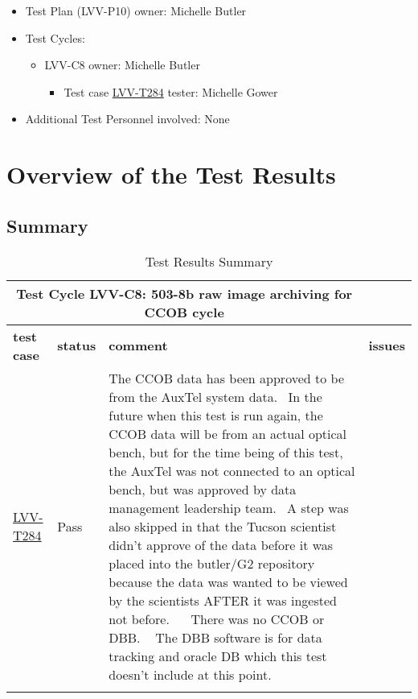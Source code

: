 \documentclass[DM,STR,toc]{lsstdoc}
\begin{document}
\begin{itemize}
\item Test Plan (LVV-P10) owner: Michelle Butler
\item Test Cycles:
\begin{itemize}
  \item LVV-C8 owner: 
    Michelle Butler
  \begin{itemize}
    \item Test case \href{https://jira.lsstcorp.org/secure/Tests.jspa#/testCase/LVV-T284}{LVV-T284} tester: Michelle Gower
  \end{itemize}
\end{itemize}
\item Additional Test Personnel involved: None
\end{itemize}

\newpage

\section{Overview of the Test Results}
\label{sect:overview}

\subsection{Summary}
\label{sect:summarytable}

\begin{longtable}{p{}p{}p{}p{}}
\toprule

  \multicolumn{3}{c}{ Test Cycle {\bf LVV-C8: 503-8b raw image archiving for CCOB cycle
 }} \\\hline

  {\bf \footnotesize test case} & {\bf \footnotesize status} & {\bf \footnotesize comment} & {\bf \footnotesize issues} \\\toprule

    \href{https://jira.lsstcorp.org/secure/Tests.jspa#/testCase/LVV-T284}{LVV-T284}
    & Pass & The CCOB data has been approved to be from the AuxTel system data. ~In
the future when this test is run again, the CCOB data will be from an
actual optical bench, but for the time being of this test, the AuxTel
was not connected to an optical bench, but was approved by data
management leadership team. ~A step was also skipped in that the Tucson
scientist didn't approve of the data before it was placed into the
butler/G2 repository because the data was wanted to be viewed by the
scientists AFTER it was ingested not before. ~ ~There was no CCOB or
DBB. ~ The DBB software is for data tracking and oracle DB which this
test doesn't include at this point.~~
 &
    \\\hline

\caption{Test Results Summary}
\label{table:summary}
\end{longtable}
\end{document}
